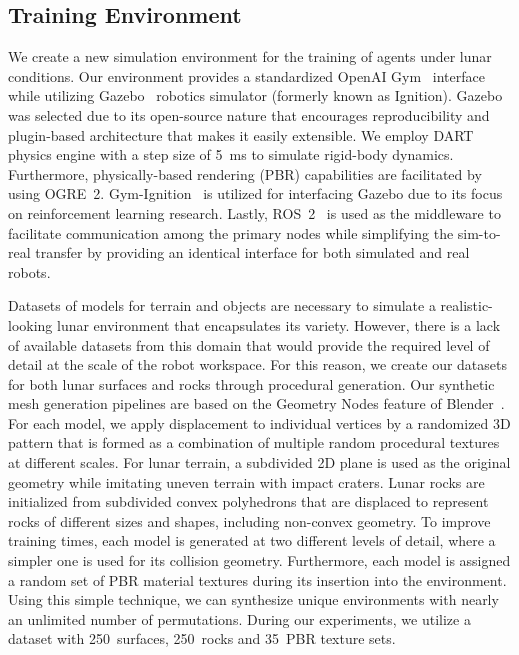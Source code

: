 \subsection{Training Environment}\label{ssec:training-environment}

We create a new simulation environment for the training of agents under lunar conditions. Our environment provides a standardized OpenAI Gym~\cite{brockman_openai_2016} interface while utilizing Gazebo~\cite{gazebo} robotics simulator (formerly known as Ignition). Gazebo was selected due to its open-source nature that encourages reproducibility and plugin-based architecture that makes it easily extensible. We employ DART physics engine with a step size of 5~ms to simulate rigid-body dynamics. Furthermore, physically-based rendering (PBR) capabilities are facilitated by using OGRE~2. Gym-Ignition~\cite{ferigo_gym-ignition_2020} is utilized for interfacing Gazebo due to its focus on reinforcement learning research. Lastly, ROS~2~\cite{ros2} is used as the middleware to facilitate communication among the primary nodes while simplifying the sim-to-real transfer by providing an identical interface for both simulated and real robots.

Datasets of models for terrain and objects are necessary to simulate a realistic-looking lunar environment that encapsulates its variety. However, there is a lack of available datasets from this domain that would provide the required level of detail at the scale of the robot workspace. For this reason, we create our datasets for both lunar surfaces and rocks through procedural generation. Our synthetic mesh generation pipelines are based on the Geometry Nodes feature of Blender~\cite{blender}. For each model, we apply displacement to individual vertices by a randomized 3D pattern that is formed as a combination of multiple random procedural textures at different scales. For lunar terrain, a subdivided 2D plane is used as the original geometry while imitating uneven terrain with impact craters. Lunar rocks are initialized from subdivided convex polyhedrons that are displaced to represent rocks of different sizes and shapes, including non-convex geometry. To improve training times, each model is generated at two different levels of detail, where a simpler one is used for its collision geometry. Furthermore, each model is assigned a random set of PBR material textures during its insertion into the environment. Using this simple technique, we can synthesize unique environments with nearly an unlimited number of permutations. During our experiments, we utilize a dataset with 250~surfaces, 250~rocks and 35~PBR texture sets.

